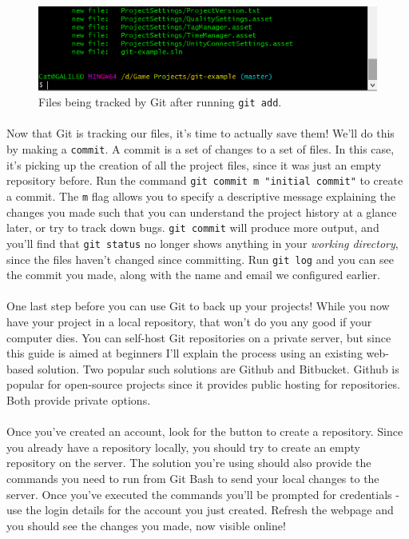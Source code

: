 \documentclass{article}
\begin{document}
\begin{figure}
    \includegraphics[width=\linewidth]{images/statusgreen.png}
    \caption{Files being tracked by Git after running \texttt{git add}.}
    \label{fig:statusgreen}
\end{figure}

\paragraph{}
Now that Git is tracking our files, it's time to actually save them! We'll do this by making a \texttt{commit}. A commit is a set of changes to a set of files. In this case, it's picking up the creation of all the project files, since it was just an empty repository before. Run the command \texttt{git commit \-m "initial commit"} to create a commit. The \texttt{\-m} flag allows you to specify a descriptive message explaining the changes you made such that you can understand the project history at a glance later, or try to track down bugs. \texttt{git commit} will produce more output, and you'll find that \texttt{git status} no longer shows anything in your \textit{working directory}, since the files haven't changed since committing. Run \texttt{git log} and you can see the commit you made, along with the name and email we configured earlier.

\paragraph{}
One last step before you can use Git to back up your projects! While you now have your project in a local repository, that won't do you any good if your computer dies. You can self-host Git repositories on a private server, but since this guide is aimed at beginners I'll explain the process using an existing web-based solution. Two popular such solutions are Github and Bitbucket. Github is popular for open-source projects since it provides public hosting for repositories. Both provide private options. 

\paragraph{}
Once you've created an account, look for the button to create a repository. Since you already have a repository locally, you should try to create an empty repository on the server. The solution you're using should also provide the commands you need to run from Git Bash to send your local changes to the server. Once you've executed the commands you'll be prompted for credentials - use the login details for the account you just created. Refresh the webpage and you should see the changes you made, now visible online!
\end{document}

